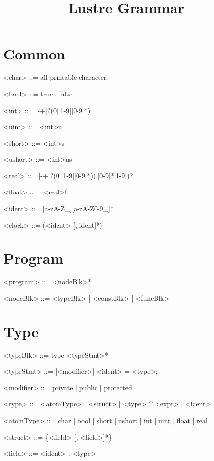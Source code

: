 \documentclass{article}
\title{\bf Lustre Grammar}
\begin{document}
\maketitle

\section{Common}
\begin{grammar} \small

<char> ::= all printable character

<bool> ::= true | false

<int> ::= [-+]?(0|[1-9][0-9]*)

<uint> ::= <int>u

<short> ::= <int>s

<ushort> ::= <int>us

<real> ::= [-+]?(0|[1-9][0-9]*)(.[0-9]*[1-9])?

<float> :: = <real>f

<ident> ::= [a-zA-Z_][a-zA-Z0-9_]*

<clock> ::= (<ident> [, ident]*)

\end{grammar}

\section{Program}
\begin{grammar}

<program> ::= <nodeBlk>*

<nodeBlk> ::= <typeBlk> | <constBlk> | <funcBlk>

\end{grammar}

\section{Type}
\begin{grammar}

<typeBlk> ::= type <typeStmt>*

<typeStmt> ::= [<modifier>] <ident> = <type>;

<modifier> ::= private | public | protected

<type> ::= <atomType> |  <struct> | <type> \^{} <expr> | <ident>

<atomType> ::= char | bool | short | ushort | int | uint | float | real

<struct> ::= \{<field> [, <field>]*\}

<field> ::= <ident> : <type>

\end{grammar}
\end{document}

